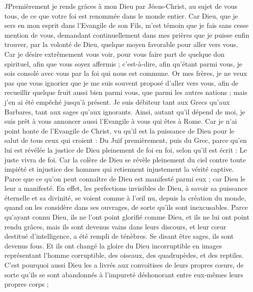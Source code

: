 \begin{multicols}{2}
JPremièrement je rends grâces à mon Dieu par Jésus-Christ, au sujet de vous tous, de ce que votre foi est renommée dans le monde entier.
Car Dieu, que je sers en mon esprit dans l'Evangile de son Fils, m'est témoin que je fais sans cesse mention de vous,
demandant continuellement dans mes prières que je puisse enfin trouver, par la volonté de Dieu, quelque moyen favorable pour aller vers vous.
Car je désire extrêmement vous voir, pour vous faire part de quelque don spirituel, afin que vous soyez affermis ;
c’est-à-dire, afin qu'étant parmi vous, je sois consolé avec vous par la foi qui nous est commune.
Or mes frères, je ne veux pas que vous ignoriez que je me suis souvent proposé d’aller vers vous, afin de recueillir quelque fruit aussi bien parmi vous, que parmi les autres nations ; mais j'en ai été empêché jusqu'à présent.
Je suis débiteur tant aux Grecs qu’aux Barbares, tant aux sages qu’aux ignorants.
Ainsi, autant qu’il dépend de moi, je suis prêt à vous annoncer aussi l'Evangile à vous qui êtes à Rome.
Car je n'ai point honte de l'Evangile de Christ, vu qu'il est la puissance de Dieu pour le salut de tous ceux qui croient : Du Juif premièrement, puis du Grec,
parce qu’en lui est révélée la justice de Dieu pleinement de foi en foi, selon qu'il est écrit : Le juste vivra de foi.
Car la colère de Dieu se révèle pleinement du ciel contre toute impiété et injustice des hommes qui retiennent injustement la vérité captive.
Parce que ce qu’on peut connaître de Dieu est manifesté parmi eux ; car Dieu le leur a manifesté.
En effet, les perfections invisibles de Dieu, à savoir sa puissance éternelle et sa divinité, se voient comme à l’œil nu, depuis la création du monde, quand on les considère dans ses ouvrages, de sorte qu'ils sont inexcusables.
Parce qu'ayant connu Dieu, ils ne l'ont point glorifié comme Dieu, et ils ne lui ont point rendu grâces, mais ils sont devenus vains dans leurs discours, et leur cœur destitué d’intelligence, a été rempli de ténèbres.
Se disant être sages, ils sont devenus fous.
Et ils ont changé la gloire du Dieu incorruptible en images représentant l'homme corruptible, des oiseaux, des quadrupèdes, et des reptiles.
C’est pourquoi aussi Dieu les a livrés aux convoitises de leurs propres cœurs, de sorte qu’ils se sont abandonnés à l’impureté déshonorant entre eux-mêmes leurs propres corps ;

\end{multicols}
